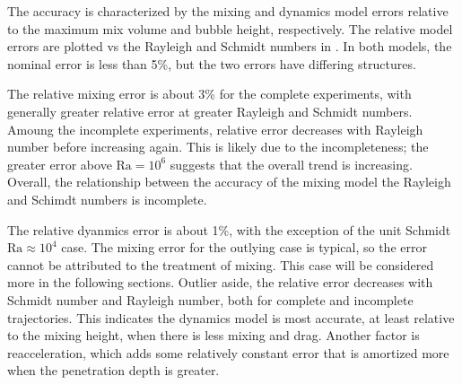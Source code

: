The accuracy is characterized by the mixing and dynamics model errors relative to the maximum mix volume and bubble height, respectively.
The relative model errors are plotted vs the Rayleigh and Schmidt numbers in .
In both models, the nominal error is less than 5\%, but the two errors have differing structures.

The relative mixing error is about 3\% for the complete experiments, with generally greater relative error at greater Rayleigh and Schmidt numbers.
Amoung the incomplete experiments, relative error decreases with Rayleigh number before increasing again.
This is likely due to the incompleteness; the greater error above $\text{Ra} = 10^6$ suggests that the overall trend is increasing.
Overall, the relationship between the accuracy of the mixing model the Rayleigh and Schimdt numbers is incomplete.

The relative dyanmics error is about 1\%, with the exception of the unit Schmidt $\text{Ra} \approx 10^4$ case.
The mixing error for the outlying case is typical, so the error cannot be attributed to the treatment of mixing.
This case will be considered more in the following sections.
Outlier aside, the relative error decreases with Schmidt number and Rayleigh number, both for complete and incomplete trajectories.
This indicates the dynamics model is most accurate, at least relative to the mixing height, when there is less mixing and drag.
Another factor is reacceleration, which adds some relatively constant error that is amortized more when the penetration depth is greater.

